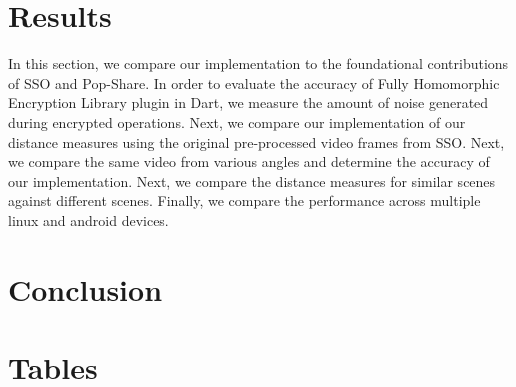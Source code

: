 \documentclass [11pt, proquest] {uwthesis}[2020/02/24]
\begin{document}





\chapter{Results}

In this section, we compare our implementation to the foundational contributions of SSO and Pop-Share. In order to evaluate the accuracy of Fully Homomorphic Encryption Library plugin in Dart, we measure the amount of noise generated during encrypted operations. Next, we compare our implementation of our distance measures using the original pre-processed video frames from SSO. Next, we compare the same video from various angles and determine the accuracy of our implementation. Next, we compare the distance measures for similar scenes against different scenes. Finally, we compare the performance across multiple linux and android devices.








\chapter{Conclusion}


%
%
\nocite{*}   %


%
%
\appendix
\raggedbottom\sloppy
 
 
\chapter{Tables}
 

\end{document}
